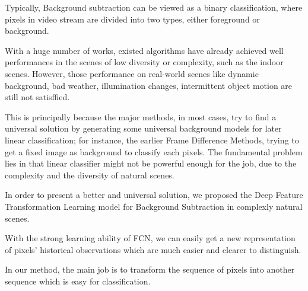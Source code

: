 \documentclass[journal]{IEEEtran}
\begin{document}

Typically, Background subtraction can be viewed as a binary classification, where pixels in video stream are divided into two
types, either foreground or background.

With a huge number of works, existed algorithms have already achieved well performances in the scenes of low diversity or complexity,
such as the indoor scenes. However, those performance on real-world scenes like dynamic background, bad weather, illumination changes,
intermittent object motion are still not satisffied.

This is principally because the major methods, in most cases, try to find a universal solution by generating some universal 
background models for later linear classification; for instance, the earlier Frame Difference Methods, trying to get a fixed 
image as background to classify each pixels. The fundamental problem lies in that linear classifier might not be powerful enough for the job,
due to the complexity and the diversity of natural scenes.

In order to present a better and universal solution, we proposed the Deep Feature Transformation Learning model for Background Subtraction 
in complexly natural scenes.

With the strong learning ability of FCN, we can easily get a new representation of pixels' historical observations which are much easier and clearer to distinguish.

In our method, the main job is to transform the sequence of pixels into another sequence which is easy for classification.
\end{document}
